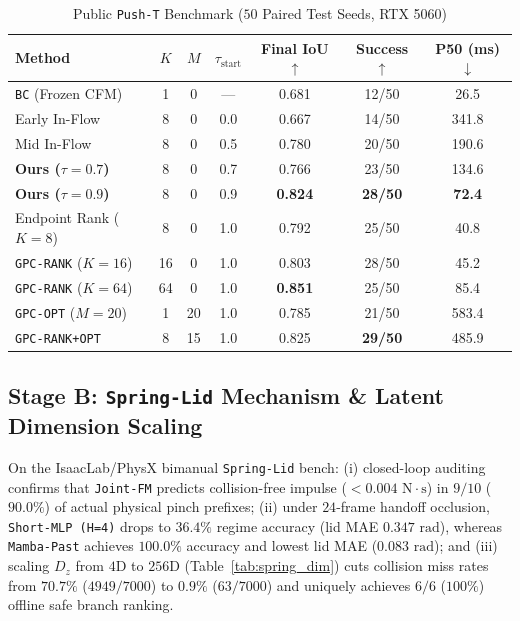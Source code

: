 \documentclass[letterpaper, 10pt, conference]{ieeeconf}
\begin{document}
\begin{table}[t]
\centering
\caption{Public \texttt{Push-T} Benchmark ($50$ Paired Test Seeds, RTX 5060)}
\label{tab:pusht}
\setlength{\tabcolsep}{3.5pt}
\begin{tabular}{lcccccc}
\toprule
Method & $K$ & $M$ & $\tau_{\text{start}}$ & Final IoU $\uparrow$ & Success $\uparrow$ & P50 (ms) $\downarrow$ \\
\midrule
\texttt{BC} (Frozen CFM) & 1 & 0 & --- & 0.681 & 12/50 & 26.5 \\
Early In-Flow & 8 & 0 & 0.0 & 0.667 & 14/50 & 341.8 \\
Mid In-Flow & 8 & 0 & 0.5 & 0.780 & 20/50 & 190.6 \\
\textbf{Ours ($\tau=0.7$)} & 8 & 0 & 0.7 & 0.766 & 23/50 & 134.6 \\
\textbf{Ours ($\tau=0.9$)} & 8 & 0 & 0.9 & \textbf{0.824} & \textbf{28/50} & \textbf{72.4} \\
Endpoint Rank ($K=8$) & 8 & 0 & 1.0 & 0.792 & 25/50 & 40.8 \\
\texttt{GPC-RANK} ($K=16$) & 16 & 0 & 1.0 & 0.803 & 28/50 & 45.2 \\
\texttt{GPC-RANK} ($K=64$) & 64 & 0 & 1.0 & \textbf{0.851} & 25/50 & 85.4 \\
\texttt{GPC-OPT} ($M=20$) & 1 & 20 & 1.0 & 0.785 & 21/50 & 583.4 \\
\texttt{GPC-RANK+OPT} & 8 & 15 & 1.0 & 0.825 & \textbf{29/50} & 485.9 \\
\bottomrule
\end{tabular}
\end{table}

\subsection{Stage B: \texttt{Spring-Lid} Mechanism \& Latent Dimension Scaling}
On the IsaacLab/PhysX bimanual \texttt{Spring-Lid} bench: (i) closed-loop auditing confirms that \texttt{Joint-FM} predicts collision-free impulse ($<0.004\text{ N}\cdot\text{s}$) in $9/10$ ($90.0\%$) of actual physical pinch prefixes; (ii) under $24$-frame handoff occlusion, \texttt{Short-MLP (H=4)} drops to $36.4\%$ regime accuracy (lid MAE $0.347\text{ rad}$), whereas \texttt{Mamba-Past} achieves $100.0\%$ accuracy and lowest lid MAE ($0.083\text{ rad}$); and (iii) scaling $D_z$ from $4\text{D}$ to $256\text{D}$ (Table~\ref{tab:spring_dim}) cuts collision miss rates from $70.7\%$ ($4949/7000$) to $0.9\%$ ($63/7000$) and uniquely achieves $6/6$ ($100\%$) offline safe branch ranking.
\end{document}
